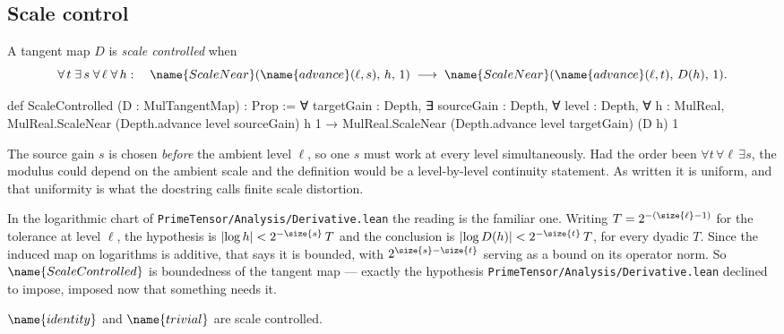 \subsection{Scale control}

\begin{definition}
\label{Analysis:Control:def:controlled}
A tangent map $D$ is \emph{scale controlled} when
\[
  \forall\, t\;
  \exists\, s\;
  \forall\, \ell\; \forall\, h : \quad
  \name{ScaleNear}(\name{advance}(\ell,s),\, h,\, 1)
  \;\longrightarrow\;
  \name{ScaleNear}(\name{advance}(\ell,t),\, D(h),\, 1).
\]
\end{definition}

\begin{leancode}
def ScaleControlled (D : MulTangentMap) : Prop :=
  ∀ targetGain : Depth,
    ∃ sourceGain : Depth,
      ∀ level : Depth, ∀ h : MulReal,
        MulReal.ScaleNear (Depth.advance level sourceGain) h 1 →
        MulReal.ScaleNear (Depth.advance level targetGain) (D h) 1
\end{leancode}

\begin{designnote}
\label{Analysis:Control:note:uniform}
The source gain $s$ is chosen \emph{before} the ambient level $\ell$, so one
$s$ must work at every level simultaneously.  Had the order been
$\forall t\,\forall \ell\,\exists s$, the modulus could depend on the ambient
scale and the definition would be a level-by-level continuity statement.  As
written it is uniform, and that uniformity is what the docstring calls finite
scale distortion.

In the logarithmic chart of
\texttt{PrimeTensor/Analysis/Derivative.lean} the reading is the familiar one.
Writing $T = 2^{-(\size{\ell}-1)}$ for the tolerance at level $\ell$, the
hypothesis is $\lvert \log h \rvert < 2^{-\size{s}}\,T$ and the conclusion is
$\lvert \log D(h) \rvert < 2^{-\size{t}}\,T$, for every dyadic $T$.  Since the
induced map on logarithms is additive, that says it is bounded, with
$2^{\size{s}-\size{t}}$ serving as a bound on its operator norm.  So
$\name{ScaleControlled}$ is boundedness of the tangent map --- exactly the
hypothesis \texttt{PrimeTensor/Analysis/Derivative.lean} declined to impose,
imposed now that something needs it.
\end{designnote}

\begin{lemma}
\label{Analysis:Control:lem:examples}
$\name{identity}$ and $\name{trivial}$ are scale controlled.
\end{lemma}

